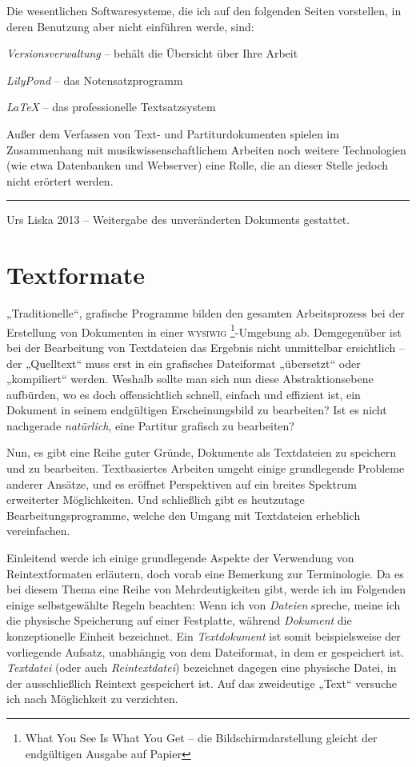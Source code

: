 \documentclass[DIV=12]{scrreprt}
\begin{document}
Die wesentlichen Softwaresysteme, die ich auf den folgenden Seiten vorstellen, in deren Benutzung aber nicht einführen werde, sind:

\begin{itemize*}
\item \emph{Versionsverwaltung} -- behält die Übersicht über Ihre Arbeit
\item \emph{LilyPond} -- das Notensatzprogramm
\item \emph{\LaTeX} -- das professionelle Textsatzsystem
\end{itemize*}

Außer dem Verfassen von Text- und Partiturdokumenten spielen im Zusammenhang mit musikwissenschaftlichem Arbeiten noch weitere Technologien (wie etwa Datenbanken und Webserver) eine Rolle, die an dieser Stelle jedoch nicht erörtert werden.

\vfill
\hrule
\medskip
\textcopyright{} Urs Liska 2013 -- Weitergabe des unveränderten Dokuments gestattet.

\tableofcontents

\chapter{Textformate}
\label{chap:pt_plain-text-format}
„Traditionelle“, grafische Programme bilden den gesamten Arbeitsprozess bei der Erstellung von Dokumenten in einer \textsc{wysiwig%
\footnote{What You See Is What You Get -- die Bildschirmdarstellung gleicht der endgültigen Ausgabe auf Papier}}-Umgebung ab.
Demgegenüber ist bei der Bearbeitung von Textdateien das Ergebnis nicht unmittelbar ersichtlich -- der „Quelltext“ muss erst in ein grafisches Dateiformat „übersetzt“ oder „kompiliert“ werden.
Weshalb sollte man sich nun diese Abstraktionsebene aufbürden, wo es doch offensichtlich schnell, einfach und effizient ist, ein Dokument in seinem endgültigen Erscheinungsbild zu bearbeiten?
Ist es nicht nachgerade \emph{natürlich}, eine Partitur grafisch zu bearbeiten?

Nun, es gibt eine Reihe guter Gründe, Dokumente als Textdateien zu speichern und zu bearbeiten.
Textbasiertes Arbeiten umgeht einige grundlegende Probleme anderer Ansätze, und es eröffnet Perspektiven auf ein breites Spektrum erweiterter Möglichkeiten.
Und schließlich gibt es heutzutage Bearbeitungsprogramme, welche den Umgang mit Textdateien erheblich vereinfachen.

Einleitend werde ich einige grundlegende Aspekte der Verwendung von Reintextformaten erläutern, doch vorab eine Bemerkung zur Terminologie.
Da es bei diesem Thema eine Reihe von Mehrdeutigkeiten gibt, werde ich im Folgenden einige selbstgewählte Regeln beachten:
Wenn ich von \emph{Dateien} spreche, meine ich die physische Speicherung auf einer Festplatte, während \emph{Dokument} die konzeptionelle Einheit bezeichnet.
Ein \emph{Textdokument} ist somit beispielsweise der vorliegende Aufsatz, unabhängig von dem Dateiformat, in dem er gespeichert ist.
\emph{Textdatei} (oder auch \emph{Reintextdatei}) bezeichnet dagegen eine physische Datei, in der ausschließlich Reintext gespeichert ist.
Auf das zweideutige „Text“ versuche ich nach Möglichkeit zu verzichten.
\end{document}
